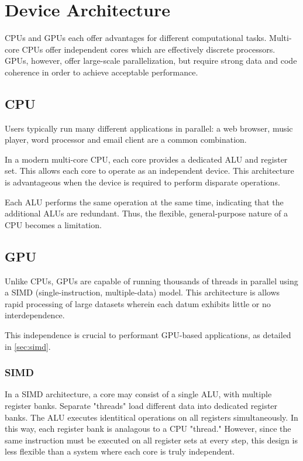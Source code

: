 \chapter{Device Architecture} \label{ch:device architecture}

CPUs and GPUs each offer advantages for different computational tasks. Multi-core CPUs offer independent cores which are effectively discrete processors. GPUs, however, offer large-scale parallelization, but require strong data and code coherence in order to achieve acceptable performance.


\section{CPU}

Users typically run many different applications in parallel: a web browser, music player, word processor and email client are a common combination.

In a modern multi-core CPU, each core provides a dedicated ALU and register set. This allows each core to operate as an independent device. This architecture is advantageous when the device is required to perform disparate operations.

Each ALU performs the same operation at the same time, indicating that the additional ALUs are redundant. Thus, the flexible, general-purpose nature of a CPU becomes a limitation.

\section{GPU}

Unlike CPUs, GPUs are capable of running thousands of threads in parallel using a SIMD (single-instruction, multiple-data) model. This architecture is allows rapid processing of large datasets wherein each datum exhibits little or no interdependence. 

This independence is crucial to performant GPU-based applications, as detailed in \autoref{sec:simd}.

\subsection{SIMD}\label{sec:simd}

In a SIMD\cite{Massingill:2007:SAP:1772070.1772078} architecture, a core may consist of a single ALU, with multiple register banks. Separate "threads" load different data into dedicated register banks. The ALU executes identitical operations on all registers simultaneously. In this way, each register bank is analagous to a CPU "thread." However, since the same instruction must be executed on all register sets at every step, this design is less flexible than a system where each core is truly independent. 

